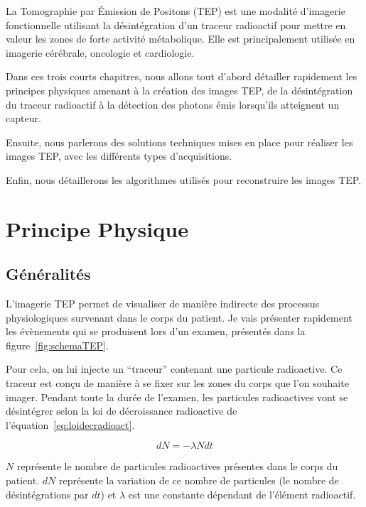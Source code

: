 
\label{lab:chapPET}
La Tomographie par \'Emission de Positons (TEP) est une modalité d'imagerie fonctionnelle utilisant la désintégration d'un traceur radioactif pour mettre en valeur les zones de forte activité métabolique. Elle est principalement utilisée en imagerie cérébrale, oncologie et cardiologie.

Dans ces trois courts chapitres, nous allons tout d'abord détailler rapidement les principes physiques amenant à la création des images TEP, de la désintégration du traceur radioactif à la détection des photons émis lorsqu'ils atteignent un capteur. 

Ensuite, nous parlerons des solutions techniques mises en place pour réaliser les images TEP, avec les différents types d'acquisitions.

Enfin, nous détaillerons les algorithmes utilisés pour reconstruire les images TEP.

 
\chapter{Principe Physique}

	\section{Généralités}

L'imagerie TEP permet de visualiser de manière indirecte des processus physiologiques survenant dans le corps du patient. Je vais présenter rapidement les évènements qui se produisent lors d'un examen, présentés dans la figure~\ref{fig:schemaTEP}.

Pour cela, on lui injecte un ``traceur'' contenant une particule radioactive. Ce traceur est conçu de manière à se fixer sur les zones du corps que l'on souhaite imager. Pendant toute la durée de l'examen, les particules radioactives vont se désintégrer selon la loi de décroissance radioactive de l'équation~\ref{eq:loidecradioact}.

\begin{equation}
	dN = - \lambda N dt
	\label{eq:loidecradioact}
\end{equation}

$N$ représente le nombre de particules radioactives présentes dans le corps du patient. $dN$ représente la variation de ce nombre de particules (le nombre de désintégrations par $dt$) et $\lambda$ est une constante dépendant de l'élément radioactif.

